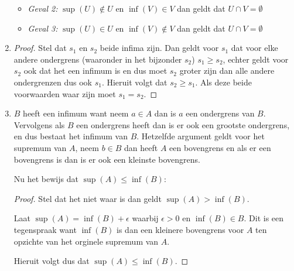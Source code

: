 \documentclass{article}
\newcommand{\tx}[1]{\text{#1}}
\newcommand{\en}{\tx{ en }}
\begin{document}
\begin{enumerate}[label=\arabic*]
\begin{itemize}
                  \item \emph{Geval 2:} $\sup(U) \notin U \en \inf(V) \in V$ dan geldt dat $U \cap V = \emptyset$
                  \item \emph{Geval 3:} $\sup(U) \in U \en \inf(V) \notin V$ dan geldt dat $U \cap V = \emptyset$
            \end{itemize}
      \item
            \begin{proof}
                  Stel dat $s_1 \en s_2$ beide infima zijn. Dan geldt voor $s_1$ dat voor elke andere ondergrens
                  (waaronder in het bijzonder $s_2$)
                  $s_1 \geq s_2$, echter geldt voor $s_2$ ook dat het een infimum is en dus
                  moet $s_2$ groter zijn dan alle andere ondergrenzen dus ook $s_1$. Hieruit volgt dat $s_2 \geq s_1$.
                  Als deze beide voorwaarden waar zijn moet $s_1 = s_2$.
            \end{proof}
      \item
            $B$ heeft een infimum want neem $a \in A$ dan is $a$ een ondergrens van $B$.
            Vervolgens als $B$ een ondergrens heeft dan is er ook een grootste ondergrens, en dus bestaat het infimum van $B$.
            Hetzelfde argument geldt voor het supremum van $A$, neem $b \in B$ dan heeft $A$ een bovengrens en als er een bovengrens is dan
            is er ook een kleinste bovengrens.

            Nu het bewijs dat $\sup(A) \leq \inf(B):$
            \begin{proof}
                  Stel dat het niet waar is dan geldt
                  $\sup(A) > \inf(B)$.

                  Laat $\sup(A) = \inf(B) + \epsilon$ waarbij $\epsilon > 0 \en \inf(B) \in B$.
                  Dit is een tegenspraak want $\inf(B)$ is dan een kleinere bovengrens voor $A$ ten opzichte van het orginele supremum van $A$.

                  Hieruit volgt dus dat $\sup(A) \leq \inf(B)$.
            \end{proof}
\end{enumerate}
\end{document}
